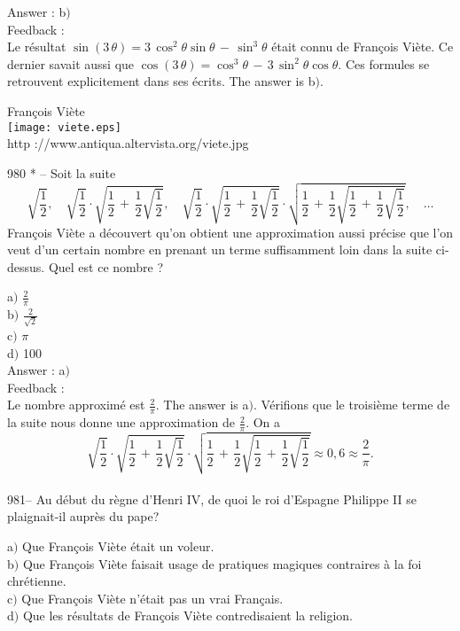 ﻿\documentclass[letterpaper, 12pt]{article}
\begin{document}
Answer : b$)$\\

Feedback : \\
Le r\'esultat
$\sin(3\,\theta)=3\,\cos^2\theta\sin\theta\,-\,\sin^3\theta$ \'etait
connu de Fran\c cois Vi\`ete. Ce dernier savait aussi que
$\cos(3\,\theta)=\cos^3\theta\,-\,3\,\sin^2\theta\cos\theta$. Ces
formules se retrouvent explicitement dans ses \'ecrits.
The answer is b$)$.\\

        \begin{center}
        Fran\c cois Vi\`ete\\
    \texttt{[image: viete.eps]}\\
        {\footnotesize http ://www.antiqua.altervista.org/viete.jpg}
    \end{center}

980 * -- Soit la suite
$$\displaystyle\sqrt{\frac12},\quad\displaystyle\sqrt{\frac12}\cdot\displaystyle\sqrt{\frac12\,+\,\frac12\sqrt{\frac12}},\quad
\displaystyle\sqrt{\frac12}\cdot\displaystyle\sqrt{\frac12\,+\,\frac12\sqrt{\frac12}}\cdot
\displaystyle\sqrt{\frac12\,+\,\frac12\sqrt{\frac12\,+\,\frac12\sqrt{\frac12}}},\quad\ldots$$
Fran\c cois Vi\`ete a d\'ecouvert qu'on obtient une approximation
aussi pr\'ecise que l'on veut d'un certain nombre en prenant un
terme suffisamment loin dans la suite ci-dessus. Quel est ce nombre
?

a$)$ $\frac2{\pi}$\\
b$)$ $\frac2{\sqrt2}$ \\
c$)$ $\pi$ \\
d$)$ 100\\

Answer : a$)$\\

Feedback : \\
Le nombre approxim\'e est $\frac2{\pi}$. The answer is a$)$.
V\'erifions que le troisi\`eme terme de la suite nous donne une
approximation de $\frac{2}{\pi}$. On a
$$\displaystyle\sqrt{\frac12}\cdot\displaystyle\sqrt{\frac12\,+\,\frac12\sqrt{\frac12}}\cdot
\displaystyle\sqrt{\frac12\,+\,\frac12\sqrt{\frac12\,+\,\frac12\sqrt{\frac12}}}\approx0,6\approx\frac2{\pi}.$$
\\

981-- Au d\'ebut du r\`egne d'Henri IV, de quoi le roi d'Espagne
Philippe II se plaignait-il aupr\`es du pape?

a$)$ Que Fran\c cois Vi\`ete \'etait un voleur. \\
b$)$ Que Fran\c cois Vi\`ete faisait usage de pratiques magiques contraires
\`a la foi chr\'etienne. \\
c$)$ Que Fran\c cois Vi\`ete n'\'etait pas un vrai Fran\c cais. \\
d$)$ Que les r\'esultats de Fran\c cois Vi\`ete contredisaient la
religion.\\
\end{document}
